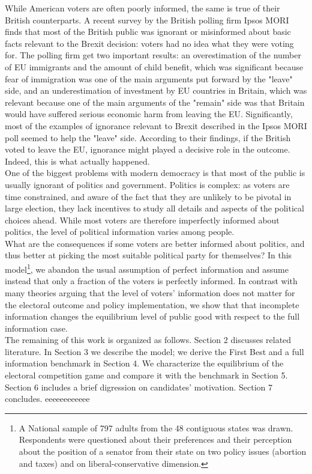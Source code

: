 \documentclass[11pt,a4paper]{article}
\begin{document}
While American voters are often poorly informed, the same is true of their British counterparts. A recent survey by the British polling firm Ipsos MORI finds that most of the British public was ignorant or misinformed about basic facts relevant to the Brexit decision: voters had no idea what they were voting for. The polling firm get two important results:  an overestimation of the number of EU immigrants and the amount of child benefit, which was significant because fear of immigration was one of the main arguments put forward by the "leave" side, and an underestimation of investment by EU countries in Britain, which was relevant because one of the main arguments of the "remain" side was that Britain would have suffered serious economic harm from leaving the EU. Significantly, most of the examples of ignorance relevant to Brexit described in the Ipsos MORI poll seemed to help the "leave" side. According to their findings, if the British voted to leave the EU, ignorance might played a decisive role in the outcome. Indeed, this is what actually happened. \\
One of the biggest problems with modern democracy is that most of the public is usually ignorant of politics and government. Politics is complex: as voters are time constrained, and aware of the fact that they are unlikely to be pivotal in large election, they lack incentives to study all details and aspects of the political choices ahead. While most voters are therefore imperfectly informed about politics, the level of political information varies among people.\\
What are the consequences if some voters are better informed about politics, and thus better at picking the most suitable political party for themselves? In this model\footnote{A National sample of 797 adults from the 48 contiguous states was drawn. Respondents were questioned about their preferences and their perception about the position of a senator from their state on two policy issues (abortion and taxes) and on liberal-conservative dimension.}, we abandon the usual assumption of perfect information and assume instead that only a fraction of the voters is perfectly informed. In contrast with many theories arguing that the level of voters' information does not matter for the electoral outcome and policy implementation, we show that that incomplete information changes the equilibrium level of public good with respect to the full information case.\\
The remaining of this work is organized as follows. Section 2 discusses related literature. In Section 3 we describe the model; we derive the First Best and a full information benchmark in Section 4. We characterize the equilibrium of the electoral competition game and compare it with the benchmark in Section 5. Section 6 includes a brief digression on candidates' motivation. Section 7 concludes.
eeeeeeeeeeee
\end{document}
